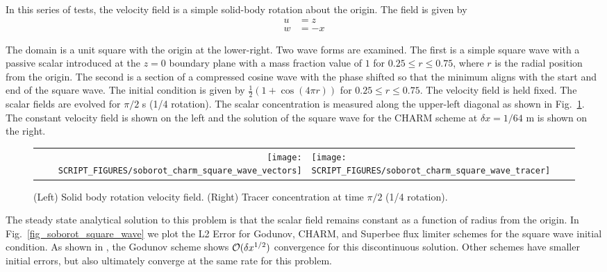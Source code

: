 \documentclass[11pt]{book}
\begin{document}
In this series of tests, the velocity field is a simple solid-body rotation about the origin.  The field is given by
\begin{align}
u &= z \\
w & = -x
\end{align}

The domain is a unit square with the origin at the lower-right.  Two wave forms are examined.  The first is a simple square wave with a passive scalar introduced at the $z=0$ boundary plane with a mass fraction value of $1$ for $0.25 \le r \le 0.75$, where $r$ is the radial position from the origin.  The second is a section of a compressed cosine wave with the phase shifted so that the minimum aligns with the start and end of the square wave.  The initial condition is given by $\frac{1}{2}(1 + \cos(4\pi r))$ for $0.25 \le r \le 0.75$.  The velocity field is held fixed.  The scalar fields are evolved for $\pi/2$ s (1/4 rotation).  The scalar concentration is measured along the upper-left diagonal as shown in Fig.~\ref{fig_soborot_images}.  The constant velocity field is shown on the left and the solution of the square wave for the CHARM scheme at $\delta x = 1/64$ m is shown on the right.

\begin{figure}[ht]{}
   \begin{tabular}{rl}
      \texttt{[image: SCRIPT\_FIGURES/soborot\_charm\_square\_wave\_vectors]} &
      \texttt{[image: SCRIPT\_FIGURES/soborot\_charm\_square\_wave\_tracer]} \\
   \end{tabular}
   \caption[Solid body rotation scalar transport]{(Left) Solid body rotation velocity field. (Right) Tracer concentration at time $\pi/2$ (1/4 rotation).}
   \label{fig_soborot_images}
\end{figure}

The steady state analytical solution to this problem is that the scalar field remains constant as a function of radius from the origin.  In Fig.~\ref{fig_soborot_square_wave} we plot the L2 Error for Godunov, CHARM, and Superbee flux limiter schemes for the square wave initial condition.  As shown in \cite{Leveque:1}, the Godunov scheme shows ${\cal O}(\delta x^{1/2})$ convergence for this discontinuous solution.  Other schemes have smaller initial errors, but also ultimately converge at the same rate for this problem.
\end{document}
